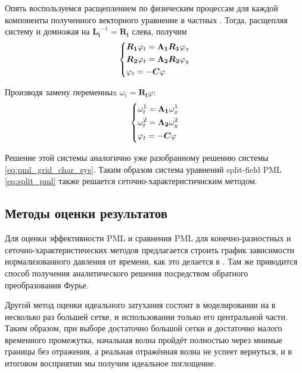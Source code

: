 Опять воспользуемся расщеплением по физическим процессам для каждой компоненты полученного векторного уравнение в частных \cite{marchuk_rasshep}. Тогда, расщепляя систему и домножая на $\bm{L_i}^{-1}=\bm{R_i}$ слева, получим
\begin{equation}
    \begin{dcases}
        \bm{R_1}\varphi_t = \bm{\Lambda_1}\bm{R_1} \varphi_x\\
        \bm{R_2}\varphi_t = \bm{\Lambda_2}\bm{R_2} \varphi_y\\
        \varphi_t = - \bm{C} \varphi  
    \end{dcases}
\end{equation}

Производя замену переменныx $\omega_i = \bm{R_i} \varphi$:
\begin{equation}
    \begin{dcases}
        \omega_t^1 = \bm{\Lambda_1}\omega_x^1 \\
        \omega_t^2 = \bm{\Lambda_2}\omega_y^2 \\
        \varphi_t = - \bm{C} \varphi  
    \end{dcases}
\end{equation}

Решение этой системы аналогично уже разобранному решению системы \eqref{eq:pml_grid_char_sys}. Таким образом система уравнений split-field PML \eqref{eq:split_pml} также решается сеточно-характеристичнским методом.

\subsection{Методы оценки результатов}

Для оценки эффективности PML и сравнения PML для конечно-разностных и сеточно-характеристических методов предлагается строить график зависимости нормализованного давления от времени, как это делается в \cite{pml-acoustic}. Там же приводится способ получения аналитического решения посредством обратного преобразования Фурье.

Другой метод оценки идеального затухания состоит в моделировании на в несколько раз большей сетке, и использовании только его центральной части. Таким образом, при выборе достаточно большой сетки и достаточно малого временного промежутка, начальная волна пройдёт полностью через мнимые границы без отражения, а реальная отражённая волна не успеет вернуться, и в итоговом восприятии мы получим идеальное поглощение.
